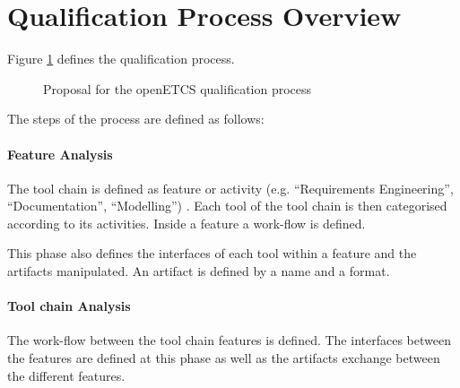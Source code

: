 \section{Qualification Process Overview}
\label{sec:process_overview}
Figure \ref{fig:qualification_process} defines the qualification
process.

\begin{figure}[htbp]
\begin{center}
\end{center}
\caption{Proposal for the openETCS qualification process}
\label{fig:qualification_process}
\end{figure}



The steps of the process are defined as follows:

\paragraph{Feature Analysis}
The tool chain is defined as feature or activity (e.g. ``Requirements
Engineering'', ``Documentation'', ``Modelling'') . Each tool of the
tool chain  is then categorised according to its activities. Inside
a feature  a work-flow is defined.

This phase  also defines  the interfaces of each tool within a feature
and the artifacts manipulated. An artifact is defined by a name and a
format.


\paragraph{Tool chain Analysis}
The work-flow between the tool chain features is defined.
The interfaces between the features are defined at this phase as well as
the artifacts exchange between the different features.

